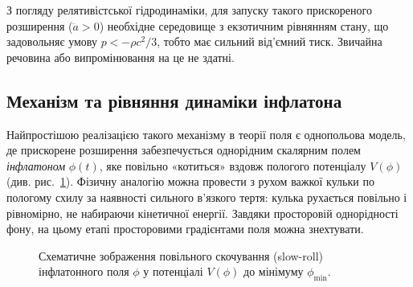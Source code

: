 \documentclass[12pt, a4paper]{article}
\begin{document}
З погляду релятивістської гідродинаміки, для запуску такого прискореного
розширення ($\ddot{a} > 0$) необхідне середовище з екзотичним рівнянням
стану, що задовольняє умову $p < -\rho c^2 / 3$, тобто має сильний
від'ємний тиск. Звичайна речовина або випромінювання на це не здатні.


\subsection{Механізм та рівняння динаміки інфлатона}
\label{subsec:inflaton_dynamics}


Найпростішою реалізацією такого механізму в теорії поля є однопольова
модель, де прискорене розширення забезпечується однорідним скалярним
полем \emph{інфлатоном} $\phi(t)$, яке повільно «котиться» вздовж
пологого потенціалу $V(\phi)$ (див. рис.~\ref{fig:slow_roll}). Фізичну аналогію можна провести з
рухом важкої кульки по пологому схилу за наявності сильного
в'язкого тертя: кулька рухається повільно і рівномірно, не
набираючи кінетичної енергії. Завдяки просторовій однорідності
фону, на цьому етапі просторовими градієнтами поля можна знехтувати.

\begin{figure}[h!]
\centering
{}

\caption{Схематичне зображення повільного скочування (slow-roll) інфлатонного поля $\phi$ у потенціалі $V(\phi)$ до мінімуму $\phi_{\min}$.}
\label{fig:slow_roll}
\end{figure}
\end{document}
